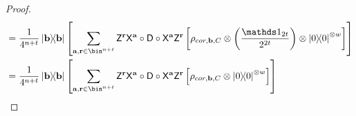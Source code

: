 \begin{proof}
\begin{align}
            &=
            \dfrac{1}{4^{n+t}}
            \ketbra\b
            \left[
                \sum_{\a, \r\in \bin^{n+t}}
                \Dec{\a}{\r}
                \circ
                \D
                \circ
                \Enc{\a}{\r}
                \left[
                    \rho_{cor, \b, C}
                    \otimes
                \left( \dfrac{\id_{2t}}{2^{2t}}
                 \right)
                \otimes
                \ketbra{0}^{\otimes w}
                \right]
            \right]
            \\
            \label{eq:paulidev:beforePOV}
            &=
            \dfrac{1}{4^{n+t}}
            \ketbra\b
            \left[
                \sum_{\a, \r\in \bin^{n+t}}
                \Dec{\a}{\r}
                \circ
                \D
                \circ
                \Enc{\a}{\r}
                \left[
                    \rho_{cor, \b, C}
                \otimes
                \ketbra{0}^{\otimes w}
                \right]
            \right]
        \end{align}


\end{proof}
